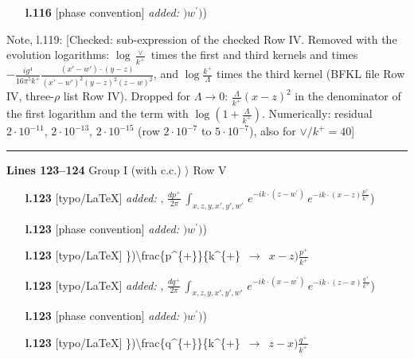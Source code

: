\documentclass[10pt]{article}
\newenvironment{notebox}{\def\FrameCommand{{\color{notebar}\vrule width 1.5pt}\hspace{6pt}}\MakeFramed{\advance\hsize-\width\FrameRestore}\small}{\endMakeFramed}
\begin{document}
\begin{itemize}[leftmargin=2.2em,itemsep=1pt,topsep=2pt]
\item[\textbf{l.116}] \textsf{\small [phase convention]} \emph{added:} $\displaystyle )$$\displaystyle w^\prime)${\color{gray}\small)}
\end{itemize}
\begin{notebox}\textsf{\small Note, l.119:} [Checked: sub-expression of the checked Row IV. Removed with the evolution logarithms: $\log\frac{\vee}{k^{+}}$ times the first and third kernels and times $-\frac{ig^{4}}{16\pi^{5}k^{+}}\frac{(x'-w')\cdot(y-z)}{(x'-w')^{2}(y-z)^{2}(z-w)^{2}}$, and $\log\frac{k^{+}}{\Lambda}$ times the third kernel (BFKL file Row IV, three-$\rho$ list Row IV). Dropped for $\Lambda\to0$: $\frac{\Lambda}{k^{+}}(x-z)^{2}$ in the denominator of the first logarithm and the term with $\log(1+\frac{\Lambda}{k^{+}})$. Numerically: residual $2\cdot10^{-11}$, $2\cdot10^{-13}$, $2\cdot10^{-15}$ (row $2\cdot10^{-7}$ to $5\cdot10^{-7}$), also for $\vee/k^{+}=40$]\end{notebox}
\par
{}\noindent\rule{\linewidth}{0.3pt}\par\noindent\textbf{Lines 123--124} \quad \textsf{Group I (with c.c.) $\rangle$ Row V} \par
\begin{itemize}[leftmargin=2.2em,itemsep=1pt,topsep=2pt]
\item[\textbf{l.123}] \textsf{\small [typo/LaTeX]} \emph{added:} $\displaystyle ,$$\displaystyle \, \frac{dp^{+}}{2\pi}\,\int_{x,z,y,x',y',w'}\,e^{-ik\cdot (z-w^\prime)}\,e^{-ik\cdot (x-z)\frac{p^{+}}{k^{+}}}${\color{gray}\small)}
\item[\textbf{l.123}] \textsf{\small [phase convention]} \emph{added:} $\displaystyle )$$\displaystyle w^\prime)${\color{gray}\small)}
\item[\textbf{l.123}] \textsf{\small [typo/LaTeX]} {\small\ttfamily \}\allowbreak{})\allowbreak{}\textbackslash{}\allowbreak{}frac\{p\^{}\{+\allowbreak{}\}\allowbreak{}\}\allowbreak{}\{k\^{}\{+\allowbreak{}\}\allowbreak{}}\ $\longrightarrow$\ $\displaystyle x-z)\frac{p^{+}}{k^{+}}$
\item[\textbf{l.123}] \textsf{\small [typo/LaTeX]} \emph{added:} $\displaystyle ,$$\displaystyle \, \frac{dq^{+}}{2\pi}\,\int_{x,z,y,x',y',w'}\,e^{-ik\cdot (x-w^\prime)}\,e^{-ik\cdot (z-x)\frac{q^{+}}{k^{+}}}${\color{gray}\small)}
\item[\textbf{l.123}] \textsf{\small [phase convention]} \emph{added:} $\displaystyle )$$\displaystyle w^\prime)${\color{gray}\small)}
\item[\textbf{l.123}] \textsf{\small [typo/LaTeX]} {\small\ttfamily \}\allowbreak{})\allowbreak{}\textbackslash{}\allowbreak{}frac\{q\^{}\{+\allowbreak{}\}\allowbreak{}\}\allowbreak{}\{k\^{}\{+\allowbreak{}\}\allowbreak{}}\ $\longrightarrow$\ $\displaystyle z-x)\frac{q^{+}}{k^{+}}$
\end{itemize}
\end{document}
